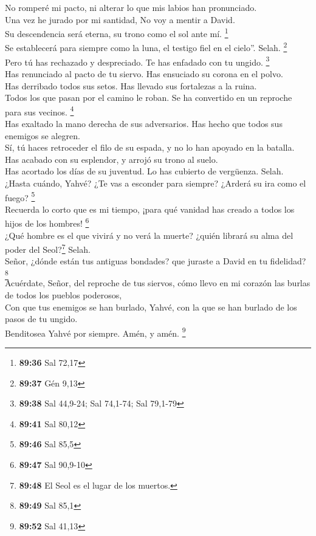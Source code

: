  No romperé mi pacto, ni alterar lo que mis labios han
pronunciado.\\
 Una vez he jurado por mi santidad, No voy a mentir a
David.\\
 Su descendencia será eterna, su trono como el sol ante
mí. \footnote{\textbf{89:36} Sal 72,17}\\
 Se establecerá para siempre como la luna, el testigo
fiel en el cielo''. Selah. \footnote{\textbf{89:37} Gén 9,13}\\
 Pero tú has rechazado y despreciado. Te has enfadado con
tu ungido. \footnote{\textbf{89:38} Sal 44,9-24; Sal 74,1-74; Sal
  79,1-79}\\
 Has renunciado al pacto de tu siervo. Has ensuciado su
corona en el polvo.\\
 Has derribado todos sus setos. Has llevado sus
fortalezas a la ruina.\\
 Todos los que pasan por el camino le roban. Se ha
convertido en un reproche para sus vecinos. \footnote{\textbf{89:41} Sal
  80,12}\\
 Has exaltado la mano derecha de sus adversarios. Has
hecho que todos sus enemigos se alegren.\\
 Sí, tú haces retroceder el filo de su espada, y no lo
han apoyado en la batalla.\\
 Has acabado con su esplendor, y arrojó su trono al
suelo.\\
 Has acortado los días de su juventud. Lo has cubierto de
vergüenza. Selah.\\
 ¿Hasta cuándo, Yahvé? ¿Te vas a esconder para siempre?
¿Arderá su ira como el fuego? \footnote{\textbf{89:46} Sal 85,5}\\
 Recuerda lo corto que es mi tiempo, ¡para qué vanidad
has creado a todos los hijos de los hombres! \footnote{\textbf{89:47}
  Sal 90,9-10}\\
 ¿Qué hombre es el que vivirá y no verá la muerte? ¿quién
librará su alma del poder del Seol?\footnote{\textbf{89:48} El Seol es
  el lugar de los muertos.} Selah.\\
 Señor, ¿dónde están tus antiguas bondades? que juraste a
David en tu fidelidad? \footnote{\textbf{89:49} Sal 85,1}\\
 Acuérdate, Señor, del reproche de tus siervos, cómo
llevo en mi corazón las burlas de todos los pueblos poderosos,\\
 Con que tus enemigos se han burlado, Yahvé, con la que
se han burlado de los pasos de tu ungido.\\
 Benditosea Yahvé por siempre. Amén, y amén. \footnote{\textbf{89:52}
  Sal 41,13}

